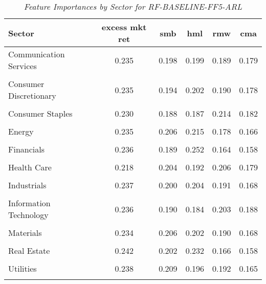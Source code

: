             \begin{table}[ht]
            \centering
            \caption{\textit{Feature Importances by Sector for RF-BASELINE-FF5-ARL}}
            \label{tab:feature_importance_rf-baseline-ff5-arl}
            \begin{tabular}{lccccc}
            \toprule
            Sector & excess mkt ret & smb & hml & rmw & cma \\
            \midrule
            Communication Services & 0.235 & 0.198 & 0.199 & 0.189 & 0.179 \\\\
Consumer Discretionary & 0.235 & 0.194 & 0.202 & 0.190 & 0.178 \\\\
Consumer Staples & 0.230 & 0.188 & 0.187 & 0.214 & 0.182 \\\\
Energy & 0.235 & 0.206 & 0.215 & 0.178 & 0.166 \\\\
Financials & 0.236 & 0.189 & 0.252 & 0.164 & 0.158 \\\\
Health Care & 0.218 & 0.204 & 0.192 & 0.206 & 0.179 \\\\
Industrials & 0.237 & 0.200 & 0.204 & 0.191 & 0.168 \\\\
Information Technology & 0.236 & 0.190 & 0.184 & 0.203 & 0.188 \\\\
Materials & 0.234 & 0.206 & 0.202 & 0.190 & 0.168 \\\\
Real Estate & 0.242 & 0.202 & 0.232 & 0.166 & 0.158 \\\\
Utilities & 0.238 & 0.209 & 0.196 & 0.192 & 0.165 \\\\
            \bottomrule
            \end{tabular}%
            \end{table}